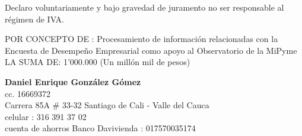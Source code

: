 \documentclass[base=hide,12pt]{elegantbook}
\begin{document}
Declaro voluntariamente y bajo gravedad de juramento no ser responsable al régimen de
IVA.\\
\vspace{.5cm}

POR CONCEPTO DE : Procesamiento de información relacionadas con la Encuesta de Desempeño Empresarial como apoyo al Observatorio de la MiPyme \\
 
LA SUMA DE: 1’000.000 (Un millón mil de pesos)\\
\vspace{3cm}


{\bf Daniel Enrique González Gómez} \\
cc. 16669372 \\
Carrera 85A # 33-32 Santiago de Cali - Valle del Cauca \\
celular : 316 391 37 02 \\
cuenta de ahorros Banco Davivienda : 017570035174 \\
                                     
\end{document}
